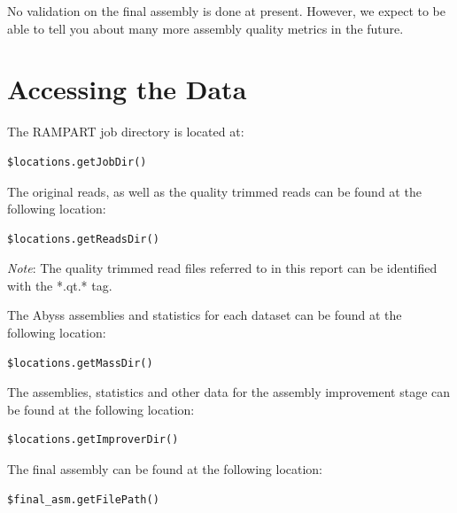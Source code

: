 \documentclass{amsart}
\begin{document}
No validation on the final assembly is done at present.  However, we expect to be able to tell you about many more assembly quality metrics in the future.


\newpage
\section{Accessing the Data}

The RAMPART job directory is located at:

\begin{lstlisting}[label=path:1]
$locations.getJobDir()
\end{lstlisting}

The original reads, as well as the quality trimmed reads can be found at the following location:

\begin{lstlisting}[label=path:1]
$locations.getReadsDir()
\end{lstlisting}

\emph{Note}: The quality trimmed read files referred to in this report can be identified with the *.qt.* tag.

The Abyss assemblies and statistics for each dataset can be found at the following location:

\begin{lstlisting}[label=path:1]
$locations.getMassDir()
\end{lstlisting}


The assemblies, statistics and other data for the assembly improvement stage can be found at the following location:

\begin{lstlisting}[label=path:1]
$locations.getImproverDir()
\end{lstlisting} 


The final assembly can be found at the following location:

\begin{lstlisting}[label=path:1]
$final_asm.getFilePath()
\end{lstlisting}
\end{document}

